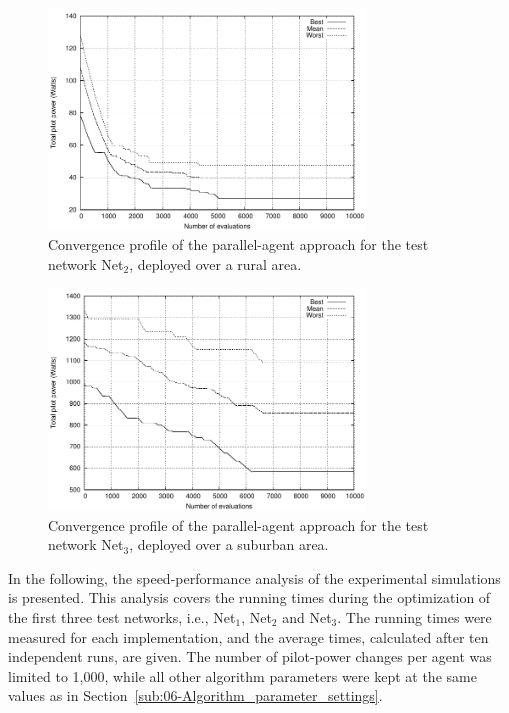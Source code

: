 \begin{figure}
\centering

\includegraphics[width=0.75\textwidth]{06-experimental_evaluation-service_coverage/img/convergence_second}

\caption{Convergence profile of the parallel-agent approach for the test network
Net$_{2}$, deployed over a rural area.\emph{\label{fig:06-Convergence_Net2}}}
\end{figure}


\begin{figure}
\centering

\includegraphics[width=0.75\textwidth]{06-experimental_evaluation-service_coverage/img/convergence_third}

\caption{Convergence profile of the parallel-agent approach for the test network
Net$_{3}$, deployed over a suburban area.\emph{\label{fig:06-Convergence_Net3}}}
\end{figure}


\bigskip{}


In the following, the speed-performance analysis of the experimental
simulations is presented. This analysis covers the running times during
the optimization of the first three test networks, i.e., Net$_{1}$,
Net$_{2}$ and Net$_{3}$. The running times were measured for each
implementation, and the average times, calculated after ten independent
runs, are given. The number of pilot-power changes per agent was limited
to 1,000, while all other algorithm parameters were kept at the same
values as in Section~\ref{sub:06-Algorithm_parameter_settings}.

